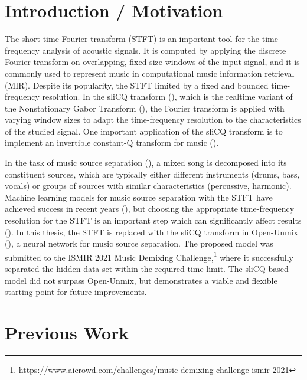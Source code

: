 \documentclass[letter,12pt]{article}
\title{\ThesisTitle}
\author{Sevag Hanssian, sevag.hanssian@mail.mcgill.ca}
\begin{document}
\maketitle

\section{Introduction / Motivation}

The short-time Fourier transform (STFT) is an important tool for the time-frequency analysis of acoustic signals. It is computed by applying the discrete Fourier transform on overlapping, fixed-size windows of the input signal, and it is commonly used to represent music in computational music information retrieval (MIR). Despite its popularity, the STFT limited by a fixed and bounded time-frequency resolution. In the sliCQ transform (\cite{slicq}), which is the realtime variant of the Nonstationary Gabor Transform (\cite{balazs}), the Fourier transform is applied with varying window sizes to adapt the time-frequency resolution to the characteristics of the studied signal. One important application of the sliCQ transform is to implement an invertible constant-Q transform for music (\cite{jbrown, klapuricqt}).

In the task of music source separation (\cite{musicsepgood}), a mixed song is decomposed into its constituent sources, which are typically either different instruments (drums, bass, vocals) or groups of sources with similar characteristics (percussive, harmonic). Machine learning models for music source separation with the STFT have achieved success in recent years (\cite{sisec2018}), but choosing the appropriate time-frequency resolution for the STFT is an important step which can significantly affect results (\cite{tftradeoff1, tftradeoff2}). In this thesis, the STFT is replaced with the sliCQ transform in Open-Unmix (\cite{umx}), a neural network for music source separation. The proposed model was submitted to the ISMIR 2021 Music Demixing Challenge,\footnote{\url{https://www.aicrowd.com/challenges/music-demixing-challenge-ismir-2021}} where it successfully separated the hidden data set within the required time limit. The sliCQ-based model did not surpass Open-Unmix, but demonstrates a viable and flexible starting point for future improvements.

\section{Previous Work}
\end{document}
